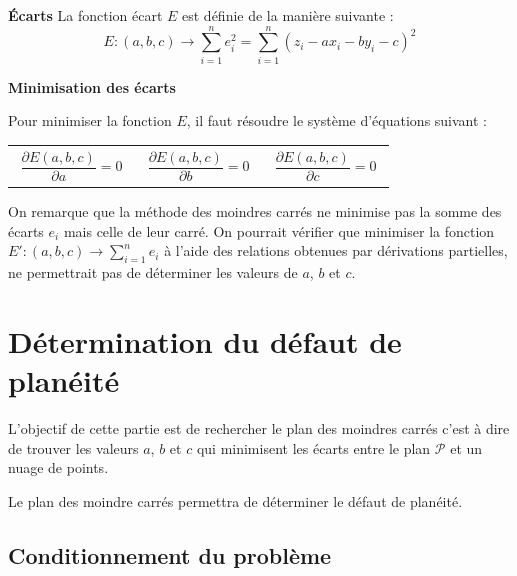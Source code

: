 \documentclass[10pt,fleqn]{article} %
\begin{document}
\begin{defi}\textbf{Écarts}
La fonction écart $E$ est définie de la manière suivante : 
$$
E:(a,b,c)\rightarrow \sum\limits_{i=1}^{n} e_i^2 = \sum\limits_{i=1}^{n} \left(z_i -ax_i -by_i -c\right)^2
$$
\end{defi}


\begin{defi}\textbf{Minimisation des écarts}

Pour minimiser la fonction $E$, il faut résoudre le système d'équations suivant :

\begin{tabular}{p{4cm}p{4cm}p{4cm}}
\begin{eqnarray}\label{eq1}
\dfrac{\partial E(a,b,c)}{\partial a} = 0 
\end{eqnarray}
&
\begin{eqnarray}\label{eq2}
\dfrac{\partial E(a,b,c)}{\partial b} = 0 
\end{eqnarray}
&
\begin{eqnarray}\label{eq3}
\dfrac{\partial E(a,b,c)}{\partial c} = 0 
\end{eqnarray}%
\end{tabular}

\end{defi}


\begin{rem}
On remarque que la méthode des moindres carrés ne minimise pas la somme des écarts $e_i$ mais celle de leur carré. On pourrait vérifier que minimiser la fonction $E':(a,b,c)\rightarrow \sum\limits_{i=1}^{n} e_i$ à l’aide des relations obtenues par dérivations partielles, ne permettrait pas de déterminer les valeurs de $a$, $b$ et $c$.
\end{rem}


\fi
\section{Détermination du défaut de planéité}

\begin{obj}
L'objectif de cette partie est de rechercher le plan des moindres carrés c'est à dire de trouver les valeurs $a$, $b$ et $c$ qui minimisent les écarts entre le plan $\mathcal{P}$ et un nuage de points. 

Le plan des moindre carrés permettra de déterminer le défaut de planéité.
\end{obj}

\subsection{Conditionnement du problème}
\end{document}
